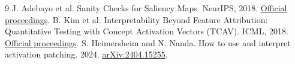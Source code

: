\documentclass[11pt]{article}
\begin{document}
\begin{thebibliography}{9}
 J. Adebayo et al. Sanity Checks for Saliency Maps. NeurIPS, 2018.
\href{https://proceedings.neurips.cc/paper/2018/hash/294a8ed24b1ad22ec2e7efea049b8737-Abstract.html}{Official proceedings}.
 B. Kim et al. Interpretability Beyond Feature Attribution: Quantitative Testing with Concept Activation Vectors (TCAV). ICML, 2018.
\href{https://proceedings.mlr.press/v80/kim18d.html}{Official proceedings}.
 S. Heimersheim and N. Nanda. How to use and interpret activation patching. 2024.
\href{https://arxiv.org/abs/2404.15255}{arXiv:2404.15255}.
\end{thebibliography}
\end{document}
